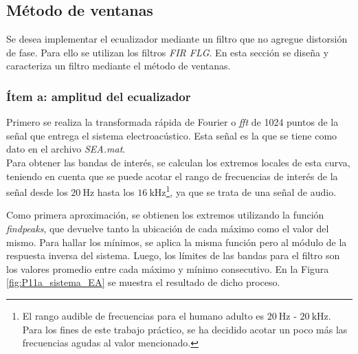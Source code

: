 
\subsection{Método de ventanas}

Se desea implementar el ecualizador mediante un filtro que no agregue distorsión de fase. Para ello se utilizan los filtros \emph{FIR FLG}. En esta sección se diseña y caracteriza un filtro mediante el método de ventanas.

% 

	\subsubsection{Ítem a: amplitud del ecualizador}


	Primero se realiza la transformada rápida de Fourier o \textit{fft} de 1024 puntos de la señal que entrega el sistema electroacústico. Esta señal es la que se tiene como dato en el archivo \textit{SEA.mat}.\\

Para obtener las bandas de interés, se calculan los extremos locales de esta curva, teniendo en cuenta que se puede acotar el rango de frecuencias de interés de la señal desde los $\SI{20}{\Hz}$ hasta los $\SI{16}{\kilo\Hz}$\footnote{El rango audible de frecuencias para el humano adulto es $\SI{20}{\Hz}$ - $\SI{20}{\kilo\Hz}$. Para los fines de este trabajo práctico, se ha decidido acotar un poco más las frecuencias agudas al valor mencionado.}, ya que se trata de una señal de audio.\\

	
	Como primera aproximación, se obtienen los extremos utilizando la función \textit{findpeaks}, que devuelve tanto la ubicación de cada máximo como el valor del mismo. Para hallar los mínimos, se aplica la misma función pero al módulo de la respuesta inversa del sistema. Luego, los límites de las bandas para el filtro son los valores promedio entre cada máximo y mínimo consecutivo. En la Figura \ref{fig:P11a_sistema_EA} se muestra el resultado de dicho proceso.\\


